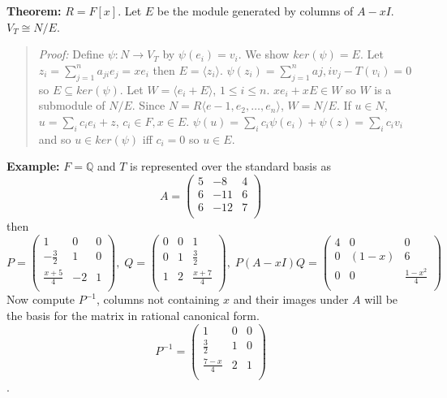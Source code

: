 \\
\\
{\bf Theorem:} $R=F[x]$.  Let $E$ be the module generated by columns of $A-xI$.  $V_T \cong N/E$.
\begin{quote}
\emph{Proof:} 
Define $\psi: N \rightarrow V_T$ by $\psi(e_i)=v_i$.  
We show $ker(\psi)=E$. 
Let $z_i = \sum_{j=1}^n a_{ji}e_j =xe_i$ then $E= \langle z_i \rangle$.
$\psi(z_i) = \sum_{j=1}^n a{j,i}v_j - T(v_i)= 0$ so $E \subseteq ker(\psi)$.
Let $W = \langle e_i + E \rangle$, $1 \leq i \leq n$.  $x e_i + xE \in W$ so $W$ is a submodule of $N/E$.
Since $N= R \langle e-1 , e_2 , \ldots , e_n \rangle$, $W= N/E$.  If $u \in N$, $u = \sum_i c_i e_i + z$, $c_i \in F, x \in E$.
$\psi(u)=  \sum_i c_i \psi(e_i) + \psi(z) = \sum_i c_i v_i$ and so $u \in ker(\psi)$ iff $c_i =0$ so $u \in E$.
\end{quote}
{\bf Example:} $F = \mathbb{Q}$ and $T$ is represented over the standard basis as
$$
A =
\left(
\begin{array}{ccc}
5 & -8 & 4\\
6 & -11& 6\\
6 & -12& 7\\
\end{array}
\right)
$$
then
$$
P =
\left(
\begin{array}{ccc}
1 & 0 & 0\\
-{\frac 3 2} & 1 & 0\\
{\frac {x+5} 4} & -2& 1\\
\end{array}
\right),\;
Q =
\left(
\begin{array}{ccc}
0 & 0 & 1\\
0 & 1& {\frac 3 2}\\
1 & 2& {\frac {x+7} 4}\\
\end{array}
\right),\;
P(A-xI)Q =
\left(
\begin{array}{ccc}
4 & 0 & 0\\
0 & (1-x) & 6\\
0 & 0& {\frac {1-x^2} 4} \\
\end{array}
\right)
$$
Now compute $P^{-1}$, columns not containing $x$ and their images under $A$ will be the basis for the matrix in rational canonical form.
$$
P^{-1} =
\left(
\begin{array}{ccc}
1 & 0 & 0\\
{\frac 3 2} & 1 & 0\\
{\frac {7-x} 4}  & 2& 1\\
\end{array}
\right)
$$.
